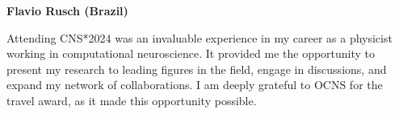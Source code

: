 \noindent{}\textbf{Flavio Rusch (Brazil)}
\begin{displayquote}
Attending CNS*2024 was an invaluable experience in my career as a physicist working in computational neuroscience. It provided me the opportunity to present my research to leading figures in the field, engage in discussions, and expand my network of collaborations. I am deeply grateful to OCNS for the travel award, as it made this opportunity possible.
\end{displayquote}

